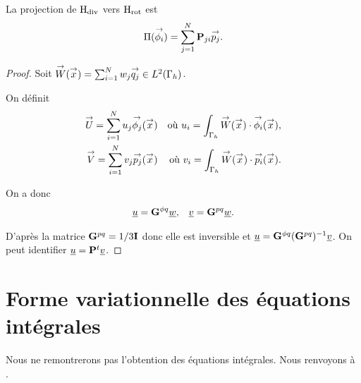   \begin{prop}La projection de \(\Hdiv\) vers \(\Hrot\) est
    \begin{equation*}
      \Pi(\phii) = \sum_{j=1}^N \mPP_{ji}\pj.
    \end{equation*}
  \end{prop}

  \begin{proof}
    Soit \(\vect{W}(\vx) = \sum_{i=1}^N w_j \qj \in L^2(\Gamma_h)\).

    On définit
    \begin{align*}
      \vect{U}= \sum_{i=1}^N u_j \phij(\vx) && \text{où~} u_i = \int_{\Gamma_h} \vect{W}(\vx)\cdot\phii(\vx),
      \\
      \vect{V} = \sum_{i=1}^N v_j \pj(\vx) && \text{où~} v_i = \int_{\Gamma_h} \vect{W}(\vx)\cdot\pii(\vx).
    \end{align*}

    On a donc
    \begin{align*}
      \comp{u}=\mG{\phi}{q}\comp{w},
      &&
      \comp{v}=\mG{p}{q}\comp{w}.
    \end{align*}

    D'après \cite[annexe B]{stupfel_implementation_2015} la matrice \(\mG{p}{q}=1/3\mI\) donc elle est inversible et \(\comp{u} = \mG{\phi}{q} (\mG{p}{q})^{-1} \comp{v}\). On peut identifier \(\comp{u}= \mPP^{t}\comp{v}\).

  \end{proof}




\section{Forme variationnelle des équations intégrales}

  Nous ne remontrerons pas l'obtention des équations intégrales. 
  Nous renvoyons à \cite[Section~5.5, p.~234]{nedelec_acoustic_2001}.

